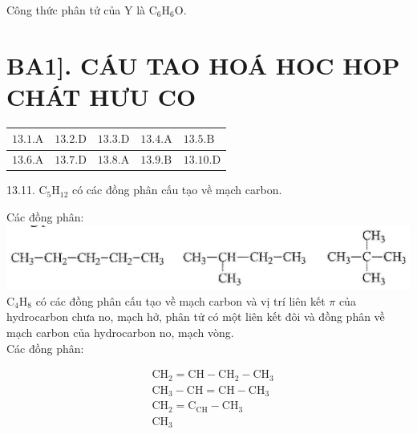 \documentclass[10pt]{article}
\begin{document}
Công thức phân tử của Y là $\mathrm{C}_{6} \mathrm{H}_{6} \mathrm{O}$.

\section*{BA1]. CÁU TAO HOÁ HOC HOP CHÁT HƯU CO}
\begin{center}
\begin{tabular}{|l|l|l|l|l|}
\hline
$13.1 . \mathrm{A}$ & $13.2 . \mathrm{D}$ & $13.3 . \mathrm{D}$ & $13.4 . \mathrm{A}$ & $13.5 . \mathrm{B}$ \\
\hline
$13.6 . \mathrm{A}$ & $13.7 . \mathrm{D}$ & $13.8 . \mathrm{A}$ & $13.9 . \mathrm{B}$ & $13.10 . \mathrm{D}$ \\
\hline
\end{tabular}
\end{center}

13.11. $\mathrm{C}_{5} \mathrm{H}_{12}$ có các đồng phân cấu tạo về mạch carbon.

Các đồng phân:\\
\includegraphics[max width=\textwidth, center]{2025_10_23_ed7118e3280f74e91193g-21(1)}\\
$\mathrm{C}_{4} \mathrm{H}_{8}$ có các đồng phân cấu tạo về mạch carbon và vị trí liên kết $\pi$ của hydrocarbon chưa no, mạch hở, phân tử có một liên kết đôi và đồng phân về mạch carbon của hydrocarbon no, mạch vòng.\\
Các đồng phân:

$$
\begin{aligned}
& \mathrm{CH}_{2}=\mathrm{CH}-\mathrm{CH}_{2}-\mathrm{CH}_{3} \\
& \mathrm{CH}_{3}-\mathrm{CH}=\mathrm{CH}-\mathrm{CH}_{3} \\
& \mathrm{CH}_{2}=\mathrm{C}_{\mathrm{CH}}-\mathrm{CH}_{3} \\
& \mathrm{CH}_{3}
\end{aligned}
$$
\end{document}
